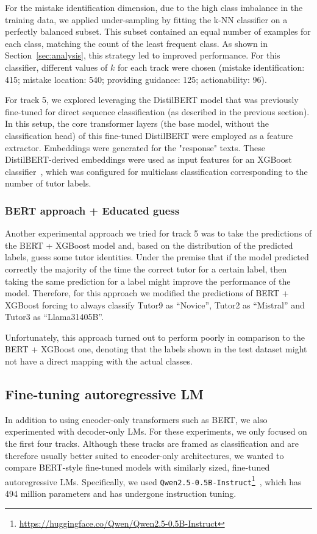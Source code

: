 \documentclass[11pt]{article}
\begin{document}
For the mistake identification dimension, due to the high class imbalance in the training data, we applied under-sampling by fitting the k-NN classifier on a perfectly balanced subset.
This subset contained an equal number of examples for each class, matching the count of the least frequent class.
As shown in Section~\ref{sec:analysis}, this strategy led to improved performance.
For this classifier, different values of $k$ for each track were chosen (mistake identification: 415; mistake location: 540; providing guidance: 125; actionability: 96).

For track 5, we explored leveraging the DistilBERT model that was previously fine-tuned for direct sequence classification (as described in the previous section). In this setup, the core transformer layers (the base model, without the classification head) of this fine-tuned DistilBERT were employed as a feature extractor. Embeddings were generated for the "response" texts. These DistilBERT-derived embeddings were used as input features for an XGBoost classifier~\cite{chen2016xgboost}, which was configured for multiclass classification corresponding to the number of tutor labels. 

\subsubsection{BERT approach + Educated guess}
Another experimental approach we tried for track 5 was to take the predictions of the BERT + XGBoost model and, based on the distribution of the predicted labels, guess some tutor identities. Under the premise that if the model predicted correctly the majority of the time the correct tutor for a certain label, then taking the same prediction for a label might improve the performance of the model. 
Therefore, for this approach we modified the predictions of BERT + XGBoost forcing to always classify Tutor9 as ``Novice'', Tutor2 as ``Mistral'' and Tutor3 as ``Llama31405B''.

Unfortunately, this approach turned out to perform poorly in comparison to the BERT + XGBoost one, denoting that the labels shown in the test dataset might not have a direct mapping with the actual classes.

\subsection{Fine-tuning autoregressive LM}
\label{sec:ftllm}

In addition to using encoder-only transformers such as BERT, we also experimented with decoder-only LMs.
For these experiments, we only focused on the first four tracks.
Although these tracks are framed as classification and are therefore usually better suited to encoder-only architectures, we wanted to compare BERT-style fine-tuned models with similarly sized, fine-tuned autoregressive LMs.
Specifically, we used \texttt{Qwen2.5-0.5B-Instruct}\footnote{\url{https://huggingface.co/Qwen/Qwen2.5-0.5B-Instruct}}~\cite{qwen2.5,qwen2}, which has 494 million parameters and has undergone instruction tuning.
\end{document}
